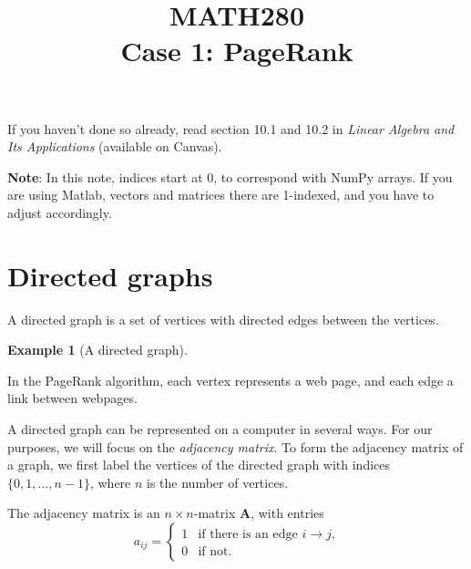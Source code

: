 \documentclass[a4paper]{scrartcl}
\title{MATH280\\ Case 1: PageRank}
\date{}
\theoremstyle{definition}
\newtheorem*{example}{Example}
\newcommand*{\mat}[1]{\mathbf{#1}}
\begin{document}
	\maketitle
	
	If you haven't done so already, read section 10.1 and 10.2 in \emph{Linear Algebra and Its Applications} (available on Canvas).
	
	\textbf{Note}: In this note, indices start at 0, to correspond with NumPy arrays. If you are using Matlab, vectors and matrices there are 1-indexed, and you have to adjust accordingly.
	
	\section{Directed graphs}
	A directed graph is a set of vertices with directed edges between the vertices.
	\begin{example}[A directed graph]
	\phantom{x}\\
	\end{example}
	In the PageRank algorithm, each vertex represents a web page, and each edge a link between webpages.
	
	A directed graph can be represented on a computer in several ways. For our purposes, we will focus on the \emph{adjacency matrix}. To form the adjacency matrix of a graph, we first label the vertices of the directed graph with indices  $\{0,1,\dotsc, n-1\}$, where $n$ is the number of vertices.
	
	The adjacency matrix is an $n\times n$-matrix $\mat{A}$, with entries
	\[a_{ij}= \begin{cases} 1 & \text{if there is an edge $i\to j$,}\\
							0 & \text{if not.}
								\end{cases}
	\]
	
\end{document}
